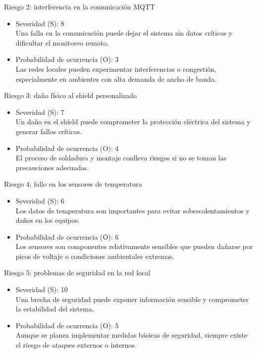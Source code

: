 \documentclass[
11pt, %
]{charter}
\begin{document}
Riesgo 2: interferencia en la comunicación MQTT
\begin{itemize}
	\item Severidad (S): 8 \\ 
	Una falla en la comunicación puede dejar el sistema sin datos críticos y dificultar el monitoreo remoto.
	\item Probabilidad de ocurrencia (O): 3 \\
	Las redes locales pueden experimentar interferencias o congestión, especialmente en ambientes con alta demanda de ancho de banda.
\end{itemize}   

Riesgo 3: daño físico al shield personalizado
\begin{itemize}
	\item Severidad (S): 7 \\ 
	Un daño en el shield puede comprometer la protección eléctrica del sistema y generar fallos críticos.
	\item Probabilidad de ocurrencia (O): 4 \\
	El proceso de soldadura y montaje conlleva riesgos si no se toman las precauciones adecuadas.
\end{itemize}   

Riesgo 4: fallo en los sensores de temperatura
\begin{itemize}
	\item Severidad (S): 6 \\ 
	Los datos de temperatura son importantes para evitar sobrecalentamientos y daños en los equipos.
	\item Probabilidad de ocurrencia (O): 6 \\
	Los sensores son componentes relativamente sensibles que pueden dañarse por picos de voltaje o condiciones ambientales extremas.
\end{itemize}   

Riesgo 5: problemas de seguridad en la red local
\begin{itemize}
	\item Severidad (S): 10 \\ 
	Una brecha de seguridad puede exponer información sensible y comprometer la estabilidad del sistema.
	\item Probabilidad de ocurrencia (O): 5 \\
	Aunque se planea implementar medidas básicas de seguridad, siempre existe el riesgo de ataques externos o internos.
\end{itemize}   
\end{document}
